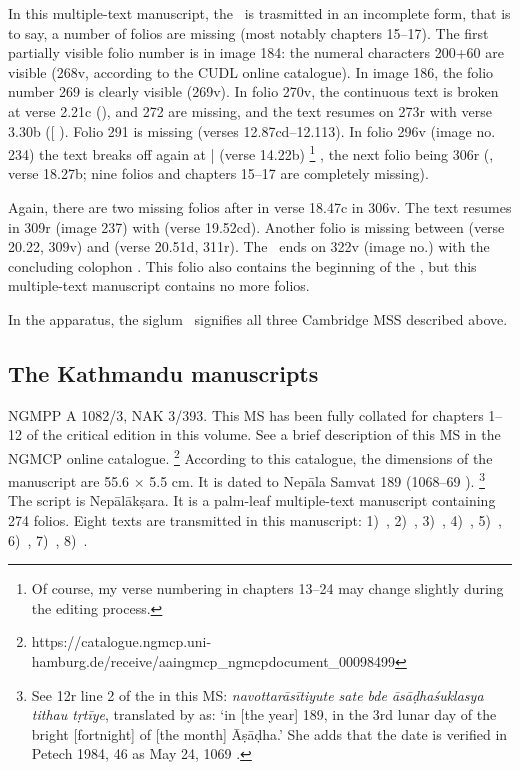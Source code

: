 In this multiple-text manuscript, the \VSS\ is trasmitted in an incomplete
form, that is to say, a number of folios are missing (most notably
chapters 15--17). The first partially visible folio number is in image
184: the numeral characters 200+60 are visible (268v, according to the
CUDL online catalogue). In image 186, the folio number 269 is clearly
visible (\fol269v). In folio 270v, the continuous text is broken at verse
2.21c (),  and 272 are missing, and the text
resumes on \fol273r with verse 3.30b ({[}\skt{ahiṃsā
pa}{]} ). Folio 291 is missing (verses
12.87cd--12.113). In folio 296v (image no. 234) the text breaks off
again at  |  (verse 14.22b)%
        \footnote{Of course, my verse numbering in chapters 13--24 may change slightly
                  during the editing process.}
, the next folio being 306r (,
verse 18.27b; nine folios and chapters 15--17 are completely
missing).

Again, there are two missing folios after  in
verse 18.47c in \fol306v. The text resumes in \fol309r (image 237)
with  (verse 19.52cd). Another folio is missing between  (verse
20.22, \fol309v) and  (verse 20.51d, \fol311r). The \VSS\ ends on \fol322v (image no.) with the
concluding colophon . 
This folio also contains the beginning of the , 
but this multiple-text manuscript contains no more folios.

In the apparatus, the siglum \mssCaCbCc\ signifies all three Cambridge 
MSS described above.

\medskip
\subsection{The Kathmandu manuscripts}
NGMPP A 1082/3, NAK 3/393. This MS has been fully 
collated for chapters 1--12 of the critical edition in this volume. 
See a brief description of this MS in
the NGMCP online catalogue.%
	\footnote{https://catalogue.ngmcp.uni-hamburg.de/receive/aaingmcp\_ngmcpdocument\_00098499}
According to this catalogue, the dimensions of the 
manuscript are 55.6 × 5.5 cm. 
It is dated to Nepāla Samvat 189 (1068--69 \CE).%
	\footnote{See \fol12r line 2 of the 
	 in this MS: 
	\emph{navottarāsītiyute sate bde āsāḍhaśuklasya
  tithau tṛtīye}, translated by  as: 
  `in {[}the year{]} 189, in the 3rd lunar day of the bright {[}fortnight{]}
  of {[}the month{]} Āṣāḍha.' She adds that the date is verified in
  Petech 1984, 46 as May 24, 1069 \CE.} The script is Nepālākṣara. It is
a palm-leaf multiple-text manuscript containing 274 folios. Eight texts
are transmitted in this manuscript: 
1)~\SDhS,
2)~\SDhU,
3)~\SDhSangr,
4)~\Ums,
5)~\SivaUp,
6)~\Vss,
7)~\DharmP,
8)~\Uums.

